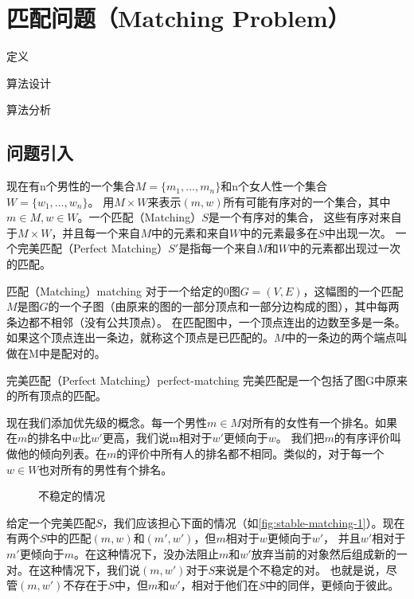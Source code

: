\chapter{匹配问题（Matching Problem）}

\begin{introduction}
	\item 定义
	\item 算法设计
	\item 算法分析
\end{introduction}

\section{问题引入}\label{sec:stable-matching-def}
现在有n个男性的一个集合$M=\{m_1,\dots,m_n\}$和n个女人性一个集合$W=\{w_1,\dots,w_n\}$。
用$M\times W$来表示$(m,w)$所有可能有序对的一个集合，其中$m\in M,w\in W$。一个匹配（Matching）$S$是一个有序对的集合，
这些有序对来自于$M\times W$，并且每一个来自$M$中的元素和来自$W$中的元素最多在$S$中出现一次。
一个完美匹配（Perfect Matching）$S'$是指每一个来自$M$和$W$中的元素都出现过一次的匹配。
\begin{definition}{匹配（Matching）}{matching}
	对于一个给定的0图$G=(V,E)$，这幅图的一个匹配$M$是图$G$的一个子图（由原来的图的一部分顶点和一部分边构成的图），其中每两条边都不相邻（没有公共顶点）。
	在匹配图中，一个顶点连出的边数至多是一条。如果这个顶点连出一条边，就称这个顶点是已匹配的。$M$中的一条边的两个端点叫做在M中是配对的。
\end{definition}
\begin{definition}{完美匹配（Perfect Matching）}{perfect-matching}
	完美匹配是一个包括了图G中原来的所有顶点的匹配。
\end{definition}
现在我们添加优先级的概念。每一个男性$m\in M$对所有的女性有一个排名。如果在$m$的排名中$w$比$w'$更高，我们说m相对于$w'$更倾向于$w$。
我们把$m$的有序评价叫做他的倾向列表。在$m$的评价中所有人的排名都不相同。类似的，对于每一个$w\in W$也对所有的男性有个排名。

\begin{wrapfigure}[10]{r}{0.25\linewidth}
	\centering
	\caption{不稳定的情况}
	\label{fig:stable-matching-1}
\end{wrapfigure}
给定一个完美匹配$S$，我们应该担心下面的情况（如\autoref{fig:stable-matching-1}）。现在有两个$S$中的匹配$(m,w)$和$(m',w')$，但$m$相对于$w$更倾向于$w'$，
并且$w'$相对于$m'$更倾向于$m$。在这种情况下，没办法阻止$m$和$w'$放弃当前的对象然后组成新的一对。在这种情况下，我们说$(m,w')$对于$S$来说是个不稳定的对。
也就是说，尽管$(m,w')$不存在于$S$中，但$m$和$w'$，相对于他们在$S$中的同伴，更倾向于彼此。

